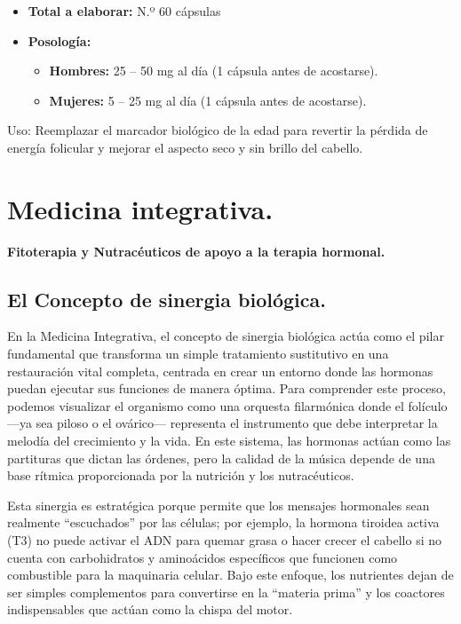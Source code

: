 \documentclass[
  spanish,
]{article}
\providecommand{\tightlist}{%
  \setlength{\itemsep}{0pt}\setlength{\parskip}{0pt}}
\begin{document}
\begin{itemize}
\tightlist
\item
  \textbf{Total a elaborar:} N.º 60 cápsulas
\item
  \textbf{Posología:}

  \begin{itemize}
  \tightlist
  \item
    \textbf{Hombres:} 25 -- 50 mg al día (1 cápsula antes de acostarse).
  \item
    \textbf{Mujeres:} 5 -- 25 mg al día (1 cápsula antes de acostarse).
  \end{itemize}
\end{itemize}

Uso: Reemplazar el marcador biológico de la edad para revertir la pérdida de energía folicular y mejorar el aspecto seco y sin brillo del cabello.

\section{Medicina integrativa.}\label{medicina-integrativa.}

\textbf{Fitoterapia y Nutracéuticos de apoyo a la terapia hormonal.}

\subsection{El Concepto de sinergia biológica.}\label{el-concepto-de-sinergia-bioluxf3gica.}

En la Medicina Integrativa, el concepto de sinergia biológica actúa como el pilar fundamental que transforma un simple tratamiento sustitutivo en una restauración vital completa, centrada en crear un entorno donde las hormonas puedan ejecutar sus funciones de manera óptima. Para comprender este proceso, podemos visualizar el organismo como una orquesta filarmónica donde el folículo ---ya sea piloso o el ovárico--- representa el instrumento que debe interpretar la melodía del crecimiento y la vida. En este sistema, las hormonas actúan como las partituras que dictan las órdenes, pero la calidad de la música depende de una base rítmica proporcionada por la nutrición y los nutracéuticos.

Esta sinergia es estratégica porque permite que los mensajes hormonales sean realmente ``escuchados'' por las células; por ejemplo, la hormona tiroidea activa (T3) no puede activar el ADN para quemar grasa o hacer crecer el cabello si no cuenta con carbohidratos y aminoácidos específicos que funcionen como combustible para la maquinaria celular. Bajo este enfoque, los nutrientes dejan de ser simples complementos para convertirse en la ``materia prima'' y los coactores indispensables que actúan como la chispa del motor.
\end{document}
